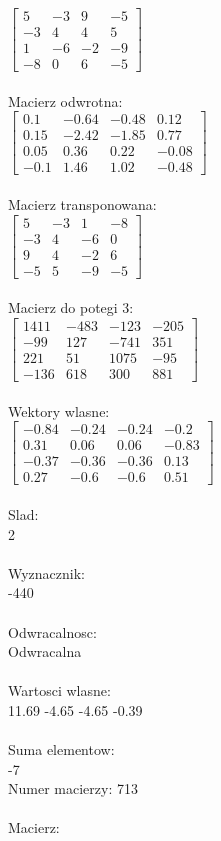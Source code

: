 \documentclass[a4paper,12pt]{article}
\begin{document}
$\begin{bmatrix} 5&-3&9&-5\\-3&4&4&5\\1&-6&-2&-9\\-8&0&6&-5 \end{bmatrix}$
\\
\\
Macierz odwrotna:\\

$\begin{bmatrix} 0.1&-0.64&-0.48&0.12\\0.15&-2.42&-1.85&0.77\\0.05&0.36&0.22&-0.08\\-0.1&1.46&1.02&-0.48 \end{bmatrix}$
\\
\\
Macierz transponowana:\\

$\begin{bmatrix} 5&-3&1&-8\\-3&4&-6&0\\9&4&-2&6\\-5&5&-9&-5 \end{bmatrix}$
\\
\\
Macierz do potegi 3:\\

$\begin{bmatrix} 1411&-483&-123&-205\\-99&127&-741&351\\221&51&1075&-95\\-136&618&300&881 \end{bmatrix}$
\\
\\
Wektory wlasne:\\

$\begin{bmatrix} -0.84&-0.24&-0.24&-0.2\\0.31&0.06&0.06&-0.83\\-0.37&-0.36&-0.36&0.13\\0.27&-0.6&-0.6&0.51 \end{bmatrix}$
\\
\\
Slad:\\
2
\\
\\
Wyznacznik:\\
-440
\\
\\
Odwracalnosc:\\
Odwracalna
\\
\\
Wartosci wlasne:\\
11.69 -4.65 -4.65 -0.39
\\
\\
Suma elementow:\\
-7
\\
\newpage
Numer macierzy:
713
\\
\\
Macierz:\\
\end{document}
